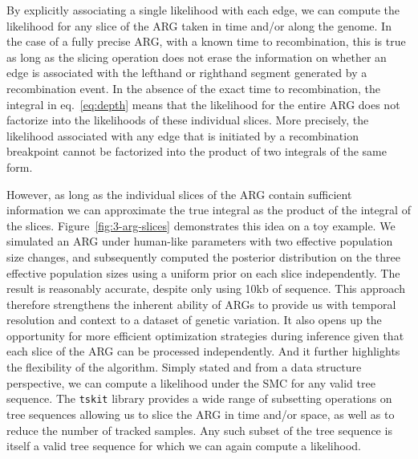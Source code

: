\documentclass{article}
\begin{document}
By explicitly associating a single likelihood with each edge,
we can compute the likelihood for any slice of the ARG taken in
time and/or along the genome.
In the case of a fully precise ARG, with a known time to recombination,
this is true as long as the slicing operation does not erase the
information on whether an edge is associated with the lefthand or
righthand segment generated by a recombination event. In the absence
of the exact time to recombination, the integral in
eq.~\eqref{eq:depth} means that the likelihood
for the entire ARG does not factorize into the likelihoods of these
individual slices. More precisely, the likelihood associated with any
edge that is initiated by a recombination breakpoint cannot be factorized
into the product of two integrals of the same form.

However, as long as the individual slices of the ARG contain sufficient
information we can approximate the true integral as the product of the
integral of the slices. Figure~\ref{fig:3-arg-slices} demonstrates this idea
on a toy example. We simulated an ARG under human-like parameters with
two effective population size changes, and subsequently computed the posterior
distribution on the three effective population sizes
using a uniform prior on each slice independently.
The result is reasonably accurate, despite only using 10kb of sequence.
This approach therefore strengthens
the inherent ability of ARGs to provide us with temporal
resolution and context to a dataset of genetic variation.
It also opens up the opportunity for more efficient optimization
strategies during inference given that each slice of the ARG can be
processed independently. And it further highlights the flexibility
of the algorithm. Simply stated and from a data structure perspective,
we can compute a likelihood under the SMC for any valid tree sequence.
The \texttt{tskit} library provides a wide range
of subsetting operations on tree sequences allowing us to slice
the ARG in time and/or space, as well as to reduce the number of
tracked samples. Any such subset of the tree sequence is itself
a valid tree sequence for which we can again compute a likelihood.
\end{document}
